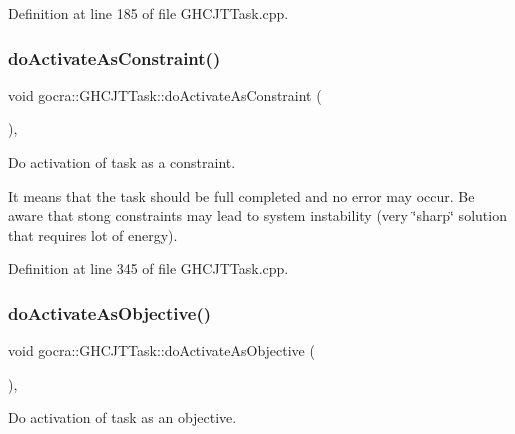 Definition at line 185 of file G\+H\+C\+J\+T\+Task.\+cpp.

\hypertarget{classgocra_1_1GHCJTTask_a3fbf21222cf652bb5563b72416a97cda}{}\label{classgocra_1_1GHCJTTask_a3fbf21222cf652bb5563b72416a97cda} 
\subsubsection{\texorpdfstring{do\+Activate\+As\+Constraint()}{doActivateAsConstraint()}}
{\footnotesize\ttfamily void gocra\+::\+G\+H\+C\+J\+T\+Task\+::do\+Activate\+As\+Constraint (\begin{DoxyParamCaption}{ }\end{DoxyParamCaption})\hspace{0.3cm}{\ttfamily [protected]}, {\ttfamily [virtual]}}

Do activation of task as a constraint.

It means that the task should be full completed and no error may occur. Be aware that stong constraints may lead to system instability (very \char`\"{}sharp\char`\"{} solution that requires lot of energy). 

Definition at line 345 of file G\+H\+C\+J\+T\+Task.\+cpp.

\hypertarget{classgocra_1_1GHCJTTask_a81a6df22509e5e98902e5ac33a43dfed}{}\label{classgocra_1_1GHCJTTask_a81a6df22509e5e98902e5ac33a43dfed} 
\subsubsection{\texorpdfstring{do\+Activate\+As\+Objective()}{doActivateAsObjective()}}
{\footnotesize\ttfamily void gocra\+::\+G\+H\+C\+J\+T\+Task\+::do\+Activate\+As\+Objective (\begin{DoxyParamCaption}{ }\end{DoxyParamCaption})\hspace{0.3cm}{\ttfamily [protected]}, {\ttfamily [virtual]}}

Do activation of task as an objective.

